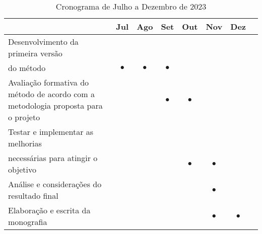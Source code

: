\documentclass[font=plain]{abnt}
\begin{document}
\begin{table}[ht]
    \centering
    \begin{tabular}{ p{7.8cm} c c c c c c c }
        \toprule
         & Jul       & Ago       & Set       & Out       & Nov       & Dez       & \\
        \midrule
        Desenvolvimento da primeira versão                                         \\ do método
         & $\bullet$ & $\bullet$ & $\bullet$ &           &           &           & \\
        \midrule
        Avaliação formativa do método de acordo com a metodologia proposta para o projeto
         &           &           & $\bullet$ & $\bullet$ &           &           & \\
        \midrule
        Testar e implementar as melhorias                                          \\ necessárias para atingir o objetivo
         &           &           &           & $\bullet$ & $\bullet$ &           & \\
        \midrule
        Análise e considerações do resultado final
         &           &           &           &           & $\bullet$ &           & \\
        \midrule
        Elaboração e escrita da monografia
         &           &           &           &           & $\bullet$ & $\bullet$ & \\
        \midrule
        \bottomrule
    \end{tabular}
    \caption{Cronograma de Julho a Dezembro de 2023}~\label{tab:cronograma_tcc_ii}
\end{table}






\end{document}
